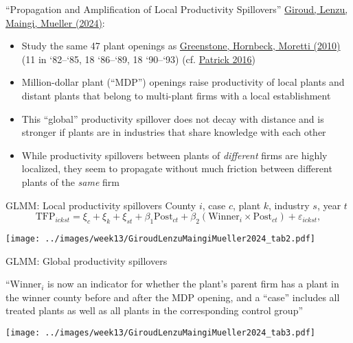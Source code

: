 \documentclass[11pt,notes=hide,aspectratio=169]{beamer}
\begin{document}
\begin{frame}{``Propagation and Amplification of Local Productivity Spillovers''}
\href{https://doi.org/10.3982/ECTA20029}{Giroud, Lenzu, Maingi, Mueller (2024)}:
\begin{itemize}
\item Study the same 47 plant openings as \href{https://www.journals.uchicago.edu/doi/abs/10.1086/653714}{Greenstone, Hornbeck, Moretti (2010)}
(11 in `82--`85, 18 `86--`89, 18 `90--`93)
(cf. \href{https://onlinelibrary.wiley.com/doi/abs/10.1111/ecin.12339}{Patrick 2016})
\item Million-dollar plant (``MDP'') openings raise productivity of local plants and distant plants that belong to multi-plant firms with a local establishment
\item This ``global'' productivity spillover does not decay with distance and is stronger if plants are in industries that share knowledge with each other
\item While productivity spillovers between plants of \textit{different} firms are highly localized, they seem to propagate without much friction between different plants of the \textit{same} firm
\end{itemize}
\end{frame}
\begin{frame}{GLMM: Local productivity spillovers}
County $i$, case $c$, plant $k$, industry $s$, year $t$
\begin{equation*}
\text{TFP}_{ickst} = \xi_c + \xi_k + \xi_{st} + \beta_1 \text{Post}_{ct} + \beta_2 (\text{Winner}_i \times \text{Post}_{ct}) + \varepsilon_{ickst},
\end{equation*}
\begin{center}
\texttt{[image: ../images/week13/GiroudLenzuMaingiMueller2024\_tab2.pdf]}
\end{center}
\end{frame}
\begin{frame}{GLMM: Global productivity spillovers}
{\footnotesize ``$\text{Winner}_{i}$ is now an indicator for whether the plant's parent firm has a plant in the winner county before and after the MDP opening, and a ``case'' includes all treated plants as well as all plants in the corresponding control group''\par}
\vspace{-3mm}
\begin{center}
\texttt{[image: ../images/week13/GiroudLenzuMaingiMueller2024\_tab3.pdf]}
\end{center}
\end{frame}
\end{document}
